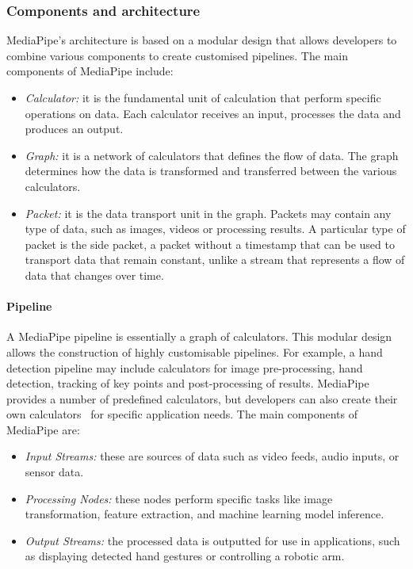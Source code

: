 \subsubsection{Components and architecture}
MediaPipe's architecture is based on a modular design that allows developers to combine various components to create customised pipelines.
The main components of MediaPipe include:
\begin{itemize}
	\item \textit{Calculator:} it is the fundamental unit of calculation that perform specific operations on data.
	Each calculator receives an input, processes the data and produces an output.
	\item \textit{Graph:} it is a network of calculators that defines the flow of data.
	The graph determines how the data is transformed and transferred between the various calculators.
	\item \textit{Packet:} it is the data transport unit in the graph.
	Packets may contain any type of data, such as images, videos or processing results.
	A particular type of packet is the side packet, a packet without a timestamp that can be used to transport data
	that remain constant, unlike a stream that represents a flow of data that changes over time.
\end{itemize}

\paragraph{Pipeline}
A MediaPipe pipeline is essentially a graph of calculators.
This modular design allows the construction of highly customisable pipelines.
For example, a hand detection pipeline may include calculators for image pre-processing,
hand detection, tracking of key points and post-processing of results.
MediaPipe provides a number of predefined calculators,
but developers can also create their own calculators~\cite{calculators-can-be-created} for specific application needs.
The main components of MediaPipe are:
\begin{itemize}
	\item \textit{Input Streams:} these are sources of data such as video feeds, audio inputs, or sensor data.
	\item \textit{Processing Nodes:} these nodes perform specific tasks like image transformation, feature extraction,
	and machine learning model inference.
	\item \textit{Output Streams:} the processed data is outputted for use in applications,
	such as displaying detected hand gestures or controlling a robotic arm.
\end{itemize}


